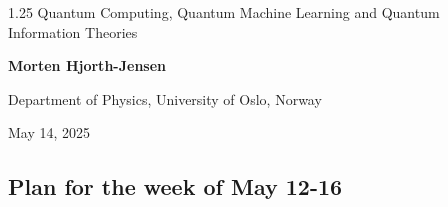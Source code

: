 \documentclass[%
oneside,                 %
final,                   %
10pt]{article}
\begin{document}

\newcommand{\exercisesection}[1]{\subsection*{#1}}






\thispagestyle{empty}

\begin{center}
{\LARGE\bf
\begin{spacing}{1.25}
Quantum Computing, Quantum Machine Learning and Quantum Information Theories
\end{spacing}
}
\end{center}


\begin{center}
{\bf Morten Hjorth-Jensen}
\end{center}

    \begin{center}
\centerline{{\small Department of Physics, University of Oslo, Norway}}
\end{center}
    

\begin{center}
May 14, 2025
\end{center}

\vspace{1cm}


\subsection*{Plan for the week of May 12-16}

\end{document}
